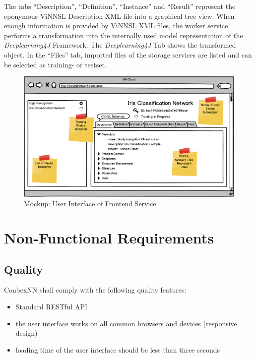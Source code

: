 The tabs ``Description'', ``Definition'', ``Instance'' and ``Result''
represent the eponymous ViNNSL Description XML file into a graphical
tree view. When enough information is provided by ViNNSL XML files, the
worker service performs a transformation into the internally used model
representation of the \emph{Deeplearning4J} Framework. The
\emph{Deeplearning4J} Tab shows the transformed object. In the ``Files''
tab, imported files of the storage services are listed and can be
selected as training- or testset.

\begin{figure}
\centering
\includegraphics[width=17.00000cm]{./images/vinnsl-ui-mockup}
\caption{Mockup: User Interface of Frontend
Service\label{vinnsl-ui-mockup}}
\end{figure}

\section{Non-Functional Requirements}\label{non-functional-requirements}

\subsection{Quality}\label{quality}

ConbexNN shall comply with the following quality features:

\begin{itemize}
\tightlist
\item
  Standard RESTful API
\item
  the user interface works on all common browsers and devices
  (responsive design)
\item
  loading time of the user interface should be less than three seconds
\end{itemize}

